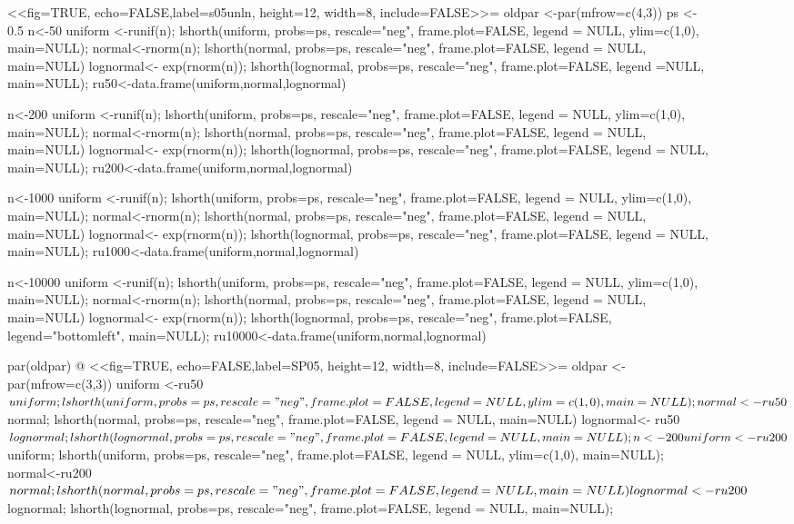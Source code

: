 \documentclass[dvips,12pt,a4paper,twoside]{amsart}
\begin{document}
\begin{figure}[htb]
<<fig=TRUE, echo=FALSE,label=s05unln, height=12, width=8, include=FALSE>>=
oldpar <-par(mfrow=c(4,3))
ps <- 0.5
n<-50
uniform <-runif(n);  lshorth(uniform, probs=ps,  rescale="neg",  frame.plot=FALSE, 
legend = NULL,  ylim=c(1,0), main=NULL);
normal<-rnorm(n); lshorth(normal, probs=ps,  rescale="neg", frame.plot=FALSE,  legend = NULL, main=NULL)
lognormal<- exp(rnorm(n)); lshorth(lognormal, probs=ps,  rescale="neg", frame.plot=FALSE,  legend =NULL, main=NULL);
ru50<-data.frame(uniform,normal,lognormal)

n<-200
uniform <-runif(n);  lshorth(uniform, probs=ps,  rescale="neg",  frame.plot=FALSE, 
legend = NULL,  ylim=c(1,0), main=NULL);
normal<-rnorm(n); lshorth(normal, probs=ps,  rescale="neg", frame.plot=FALSE,  legend = NULL, main=NULL)
lognormal<- exp(rnorm(n)); lshorth(lognormal, probs=ps,  rescale="neg", frame.plot=FALSE,  legend = NULL, main=NULL);
ru200<-data.frame(uniform,normal,lognormal)

n<-1000
uniform <-runif(n);  lshorth(uniform, probs=ps,  rescale="neg", frame.plot=FALSE, 
legend = NULL,  ylim=c(1,0), main=NULL);
normal<-rnorm(n); lshorth(normal, probs=ps,  rescale="neg", frame.plot=FALSE,  legend = NULL, main=NULL)
lognormal<- exp(rnorm(n)); lshorth(lognormal, probs=ps,  rescale="neg", frame.plot=FALSE, legend = NULL, main=NULL);
ru1000<-data.frame(uniform,normal,lognormal)

n<-10000
uniform <-runif(n);  lshorth(uniform, probs=ps,  rescale="neg", frame.plot=FALSE, 
legend = NULL,  ylim=c(1,0), main=NULL);
normal<-rnorm(n); lshorth(normal, probs=ps,  rescale="neg", frame.plot=FALSE,  legend = NULL, main=NULL)
lognormal<- exp(rnorm(n)); lshorth(lognormal, probs=ps,  rescale="neg", frame.plot=FALSE, legend="bottomleft", main=NULL);
ru10000<-data.frame(uniform,normal,lognormal)

par(oldpar)
@
<<fig=TRUE, echo=FALSE,label=SP05, height=12, width=8, include=FALSE>>=
oldpar <-par(mfrow=c(3,3))
uniform <-ru50$uniform;  lshorth(uniform, probs=ps,  rescale="neg",  frame.plot=FALSE, 
legend = NULL,  ylim=c(1,0), main=NULL);
normal<-ru50$normal; lshorth(normal, probs=ps,  rescale="neg", frame.plot=FALSE,  legend = NULL, main=NULL)
lognormal<- ru50$lognormal; lshorth(lognormal, probs=ps,  rescale="neg", frame.plot=FALSE,  legend =NULL, main=NULL);

n<-200
uniform <-ru200$uniform;  lshorth(uniform, probs=ps,  rescale="neg",  frame.plot=FALSE, 
legend = NULL,  ylim=c(1,0), main=NULL);
normal<-ru200$normal; lshorth(normal, probs=ps,  rescale="neg", frame.plot=FALSE,  legend = NULL, main=NULL)
lognormal<- ru200$lognormal; lshorth(lognormal, probs=ps,  rescale="neg", frame.plot=FALSE,  legend = NULL, main=NULL);



\end{figure}
\end{document}
